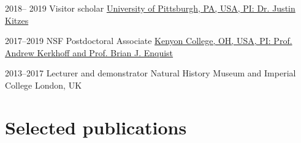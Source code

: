 \documentclass[ letterpaper]{twentysecondcv} %
\begin{document}
\begin{twenty}
\twentyitem
    	{2018-- 2019}
		{}
        {Visitor scholar}
        {\href{https://www.biology.pitt.edu/}{University of Pittsburgh, PA, USA,  PI: Dr. Justin Kitzes}}
        {}
  

	\twentyitem
    	{2017--2019}
		{}
        {NSF Postdoctoral Associate}
        {\href{https://www.kenyon.edu}{Kenyon College, OH, USA, PI: Prof. Andrew Kerkhoff and Prof. Brian J. Enquist}}
        {}
      
      
    \twentyitem
	{2013--2017}
	{}
	{Lecturer and demonstrator}
	{Natural History Museum and Imperial College London, UK}
	{}
	{
 	}
%        
\end{twenty}


\section{Selected publications}
\end{document}
